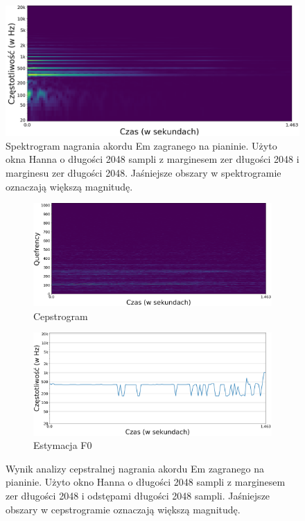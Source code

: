 \documentclass[12pt,a4paper,twoside]{mwart}
\begin{document}
\begin{figure}[H]
  \begin{center}
    \includegraphics[scale=0.27]{images/Em/spectrogram_Em_2048_512_cropped.png}
    \caption{Spektrogram nagrania akordu Em zagranego na pianinie. Użyto okna Hanna o długości 2048 sampli z marginesem zer długości 2048 i marginesu zer długości 2048. Jaśniejsze obszary w spektrogramie oznaczają większą magnitudę.}
    \label{fig:multi:em:spectrogram}
  \end{center}
\end{figure}

\begin{figure}[H]
  \begin{subfigure}{0.5\textwidth}
    \includegraphics[width=1.\linewidth]{images/Em/cepstrogram_cropped.png}
    \caption{Cepstrogram}
  \end{subfigure}
  \begin{subfigure}{0.49\textwidth}
    \includegraphics[width=1.\linewidth]{images/Em/cepstra_estimation_cropped.png}
    \caption{Estymacja F0}
    \label{fig:multi:ceps:estimation}
  \end{subfigure}
  \caption{Wynik analizy cepstralnej nagrania akordu Em zagranego na pianinie. Użyto okno Hanna o długości 2048 sampli z marginesem zer długości 2048 i odstępami długości 2048 sampli. Jaśniejsze obszary w cepstrogramie oznaczają większą magnitudę.}
  \label{fig:multi:ceps}
\end{figure}
\end{document}
